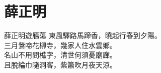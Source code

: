 \documentclass[UTF8]{ctexart}
\begin{document}
\section{薛正明}
\begin{poemz}{薛正明}{遊鴈蕩}
    東風驛路馬蹄香，曉起行春到夕陽。\\
    三月鶯啼花柳寺，幾家人住水雲鄉。\\
    名山不用問樵字，清世何須憂廟廊。\\
    且脫綸巾隨洞客，紫簫吹月夜天涼。
\end{poemz}
\end{document}
